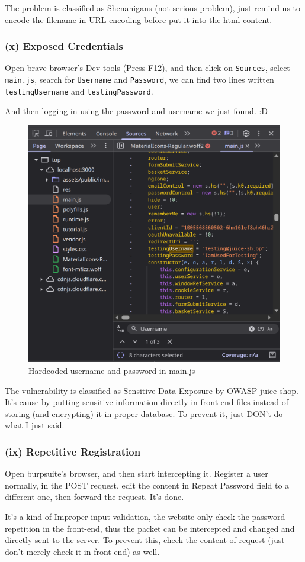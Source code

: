 \documentclass[12pt]{article}
\begin{document}
The problem is classified as Shenanigans (not serious problem), just remind us to encode the filename in URL encoding before put it into the html content.
\subsubsection*{(x) Exposed Credentials}
Open brave browser's Dev tools (Press F12), and then click on \texttt{Sources}, select \texttt{main.js}, search for \texttt{Username} and \texttt{Password}, we can find two lines written \texttt{testingUsername} and \texttt{testingPassword}. 

And then logging in using the password and username we just found. :D
\begin{figure}[H]
    \centering
    \includegraphics[width=0.5\linewidth]{5.png}
    \caption{Hardcoded username and password in main.js}
\end{figure}

The vulnerability is classified as Sensitive Data Exposure by OWASP juice shop. It's cause by putting sensitive information directly in front-end files instead of storing (and encrypting) it in proper database. To prevent it, just DON't do what I just said.

\subsubsection*{(ix) Repetitive Registration}
Open burpsuite's browser, and then start intercepting it. Register a user normally, in the POST request, edit the content in Repeat Password field to a different one, then forward the request. It's done.

It's a kind of Improper input validation, the website only check the password repetition in the front-end, thus the packet can be intercepted and changed and directly sent to the server. To prevent this, check the content of request (just don't merely check it in front-end) as well.
\end{document}
